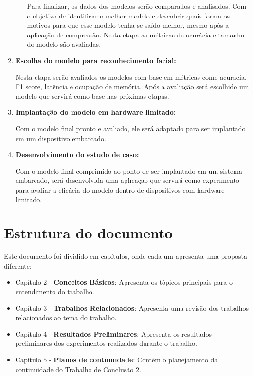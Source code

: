 \begin{enumerate}
\begin{enumerate}
			Para finalizar, os dados dos modelos serão comparados e analisados. Com o objetivo de
			identificar o melhor modelo e descobrir quais foram os motivos para que esse modelo tenha se
			saído melhor, mesmo após a aplicação de compressão. Nesta etapa as métricas de acurácia e
			tamanho do modelo são avaliadas.
	\end{enumerate}

	\item \textbf{Escolha do modelo para reconhecimento facial:}

		Nesta etapa serão avaliados os modelos com base em métricas como acurácia, F1 score, latência e ocupação de
		memória. Após a avaliação será escolhido um modelo que servirá como base nas próximas etapas.

	\item \textbf{Implantação do modelo em hardware limitado:}

		Com o modelo final pronto e avaliado, ele será adaptado para ser implantado em um dispositivo
		embarcado.


	\item \textbf{Desenvolvimento do estudo de caso:}

		Com o modelo final comprimido ao ponto de ser implantado em um sistema embarcado, será desenvolvida uma aplicação 	 	 que servirá como experimento para avaliar a eficácia do modelo dentro de dispositivos com hardware limitado.

\end{enumerate}


\section{Estrutura do documento}
Este documento foi dividido em capítulos, onde cada um apresenta uma proposta diferente:
\begin{itemize}
	\item Capítulo 2 - \textbf{Conceitos Básicos}: Apresenta os tópicos principais para o entendimento
		do trabalho.
	\item Capítulo 3 - \textbf{Trabalhos Relacionados}: Apresenta uma revisão dos trabalhos
		relacionados ao tema do trabalho.
	\item Capítulo 4 - \textbf{Resultados Preliminares}: Apresenta os resultados preliminares dos
		experimentos realizados durante o trabalho.
	\item Capítulo 5 - \textbf{Planos de continuidade}: Contém o planejamento da continuidade do
		Trabalho de Conclusão 2.
\end{itemize}

